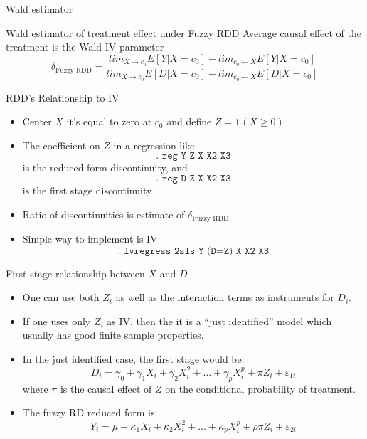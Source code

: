 \documentclass{beamer}
\begin{document}
\begin{frame}{Wald estimator}
	
	\begin{block}{Wald estimator of treatment effect under Fuzzy RDD}
	Average causal effect of the treatment is the Wald IV parameter$$\delta_{\text{Fuzzy RDD}} = \frac{ lim_{X \rightarrow c_0} E[Y | X = c_0] -  lim_{c_0 \leftarrow X} E[Y | X = c_0] } { lim_{X \rightarrow c_0} E[D | X = c_0] -  lim_{c_0 \leftarrow X} E[D | X = c_0] } $$
	\end{block}
	
\end{frame}


\begin{frame}{RDD's Relationship to IV}
	
	\begin{itemize}
	\item Center $X$ it's equal to zero at $c_0$ and define $Z=\textbf{1}(X\geq{0})$
	\item The coefficient on $Z$ in a regression like$$\texttt{. reg Y Z X X2 X3}$$ is the reduced form discontinuity, and $$\texttt{. reg D Z X X2 X3}$$ is the first stage discontinuity
	\item Ratio of discontinuities is estimate of $\delta_{\text{Fuzzy RDD}}$ 
	\item Simple way to implement is IV$$\texttt{. ivregress 2sls Y (D=Z) X X2 X3}$$
	\end{itemize}
\end{frame}



\begin{frame}{First stage relationship between $X$ and $D$}
	
	\begin{itemize}
	\item One can use both $Z_i$ as well as the interaction terms as instruments for $D_i$.  
	\item If one uses only $Z_i$ as IV, then the it is a ``just identified'' model which usually has good finite sample properties. 
	\item In the just identified case, the first stage would be:$$D_i = \gamma_0 + \gamma_1X_i+\gamma_2X_i^2 + \dots + \gamma_pX_i^p + \pi{Z}_i + \varepsilon_{1i}$$where $\pi$ is the causal effect of $Z$ on the conditional probability of treatment.
	\item The fuzzy RD reduced form is:$$Y_i = \mu + \kappa_1X_i + \kappa_2X_i^2 + \dots + \kappa_pX_i^p + \rho \pi Z_i + \varepsilon_{2i}$$
	\end{itemize}
\end{frame}
\end{document}
